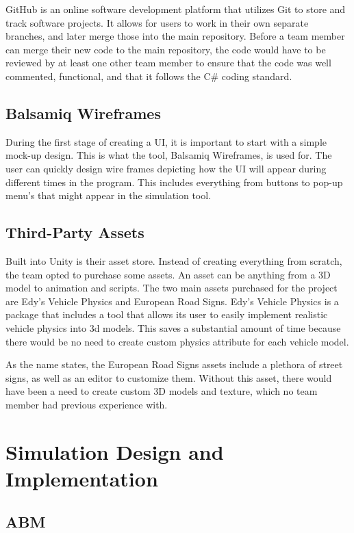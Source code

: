     GitHub\cite{github} is an online software development platform that utilizes Git to store and track software projects. It allows for users to work in their own separate branches, and later merge those into the main repository. Before a team member can merge their new code to the main repository, the code would have to be reviewed by at least one other team member to ensure that the code was well commented, functional, and that it follows the C\# coding standard.


\subsection{Balsamiq Wireframes}
    During the first stage of creating a UI, it is important to start with a simple mock-up design. This is what the tool, Balsamiq Wireframes\cite{balsamiq-wireframes}, is used for. The user can quickly design wire frames depicting how the UI will appear during different times in the program. This includes everything from buttons to pop-up menu's that might appear in the simulation tool.

\subsection{Third-Party Assets}
    Built into Unity is their asset store. Instead of creating everything from scratch, the team opted to purchase some assets. An asset can be anything from a 3D model to animation and scripts. The two main assets purchased for the project are Edy's Vehicle Physics and European Road Signs. Edy's Vehicle Physics is a package that includes a tool that allows its user to easily implement realistic vehicle physics into 3d models. This saves a substantial amount of time because there would be no need to create custom physics attribute for each vehicle model. 

    As the name states, the European Road Signs assets include a plethora of street signs, as well as an editor to customize them. Without this asset, there would have been a need to create custom 3D models and texture, which no team member had previous experience with.

\section{Simulation Design and Implementation}

    \subsection{ABM}

